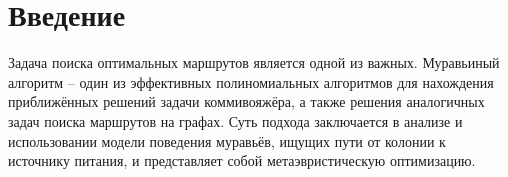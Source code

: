 \chapter*{Введение}

Задача поиска оптимальных маршрутов является одной из важных.
Муравьиный алгоритм – один из эффективных полиномиальных алгоритмов для нахождения приближённых решений задачи коммивояжёра, а также решения аналогичных задач поиска маршрутов на графах. Суть подхода заключается в анализе и использовании модели поведения муравьёв, ищущих пути от колонии к источнику питания, и представляет собой метаэвристическую оптимизацию.

